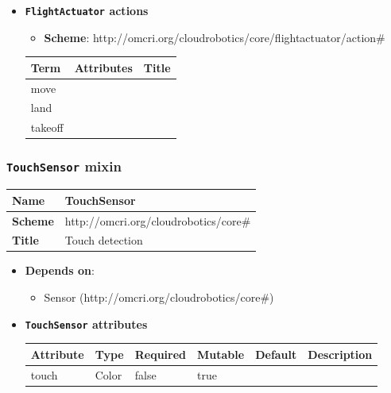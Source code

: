 \begin{itemize}
\item \textbf{\texttt{FlightActuator} actions}

\begin{itemize}
	\item \textbf{Scheme}: http://omcri.org/cloudrobotics/core/flightactuator/action\#
\end{itemize}

\begin{center}
\begin{tabular}{|l|l|l|}
  \hline
  \textbf{Term}  & \textbf{Attributes} & \textbf{Title} \\
  \hline  
  move & &  \\
  \hline
  land & &  \\
  \hline
  takeoff & &  \\
  \hline
\end{tabular}
\end{center}
\end{itemize}

 
\subsubsection{\texttt{TouchSensor} mixin}
\begin{center}
\begin{tabular}{|l|l|}
  \hline
  \textbf{Name} & TouchSensor \\
  \hline  
  \textbf{Scheme} & http://omcri.org/cloudrobotics/core\# \\
  \hline
  \textbf{Title} & Touch detection \\
  \hline
\end{tabular}
\end{center}

\begin{itemize}
\item \textbf{Depends on}:
\begin{itemize}
	\item Sensor (http://omcri.org/cloudrobotics/core\#)
\end{itemize}
\end{itemize}

\begin{itemize}
\item \textbf{\texttt{TouchSensor} attributes}

\begin{tabularx}{\textwidth}{|l|l|p{1.4cm}|p{1.3cm}|l|X|}
  \hline
  \textbf{Attribute} & \textbf{Type} & \textbf{Required} & \textbf{Mutable} & \textbf{Default} & \textbf{Description} \\
  \hline  
  touch & Color & false & true &  &  \\
  \hline
\end{tabularx}
\end{itemize}


